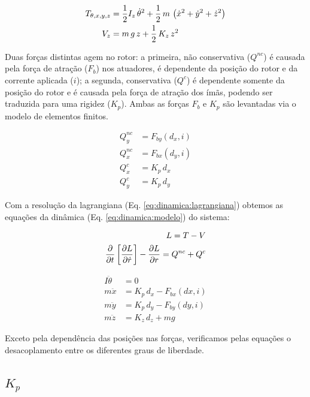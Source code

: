  \begin{align}
 	T_{\theta, x, y, z} &= \frac{1}{2} I_z \, \dot{\theta}^2 + \frac{1}{2} \, m \, \left( \dot{x}^2 + \dot{y}^2 + \dot{z}^2 \right) \notag \\
 	V_z &= m \, g \, z + \frac{1}{2} \, K_z \, z^2
 \end{align}	
 	
 Duas forças distintas agem no rotor: a primeira, não conservativa ($Q^{nc}$) é causada pela força de atração ($F_b$) nos atuadores, é dependente da posição do rotor e da corrente aplicada ($i$); a segunda, conservativa ($Q^{c}$) é dependente somente da posição do rotor e é causada pela força de atração dos ímãs, podendo ser traduzida para uma rigidez ($K_p$). Ambas as forças $F_b$ e $K_p$ são levantadas via o modelo de elementos finitos. 
	 	
 \begin{align}
 	Q_y^{nc} &= F_{by}(d_x,i)  \\
 	Q_x^{nc} &= F_{bx}(d_y,i)  \\
 	Q^{c}_x  &= K_p \, d_x \\
 	Q^{c}_y  &= K_p \, d_y 
 \end{align}
 		
  
  Com a resolução da lagrangiana (Eq. \ref{eq:dinamica:lagrangiana}) obtemos as equações da dinâmica (Eq. \ref{eq:dinamica:modelo}) do sistema:
  
   \begin{align}
   		L = T - V \notag \\
   		\frac{\partial}{\partial t} \left[ \frac{\partial L}{\partial \dot{r}} \right] -  \frac{\partial L}{\partial r} = Q^{nc} + Q^{c}
   		\label{eq:dinamica:lagrangiana}
   \end{align}
  
 	\begin{align}
 	I \ddot{\theta} &= 0 \\
 	m \ddot{x}		&= K_p \, d_x  - F_{bx}(dx,i) \\
 	m \ddot{y}		&= K_p \, d_y  - F_{by}(dy,i) \label{eq:dinamica:rotor:radial}\\	
 	m \ddot{z}  	&= K_z \, d_z + m g 
 	\label{eq:dinamica:modelo}
 	\end{align}	
 
 Exceto pela dependência das posições nas forças, verificamos pelas equações o desacoplamento entre os diferentes graus de liberdade. 

\subsection{$K_p$}

